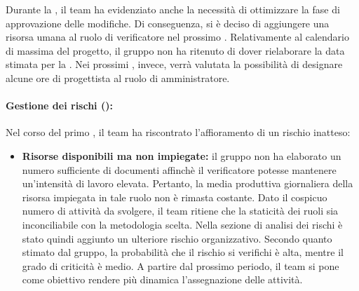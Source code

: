 \vspace{0.5\baselineskip}
\par Durante la , il team ha evidenziato anche la necessità di ottimizzare la fase di approvazione delle modifiche. Di conseguenza, si è deciso di aggiungere una risorsa umana al ruolo di verificatore nel prossimo . Relativamente al calendario di massima del progetto, il gruppo non ha ritenuto di dover rielaborare la data stimata per la . Nei prossimi , invece, verrà valutata la possibilità di designare alcune ore di progettista al ruolo di amministratore.

\paragraph*{Gestione dei rischi ():}
\par Nel corso del primo , il team ha riscontrato l'affioramento di un rischio inatteso:
\begin{itemize}
  \item \textbf{Risorse disponibili ma non impiegate:} il gruppo non ha elaborato un numero sufficiente di documenti affinchè il verificatore potesse mantenere un'intensità di lavoro elevata. Pertanto, la media produttiva giornaliera della risorsa impiegata in tale ruolo non è rimasta costante. Dato il cospicuo numero di attività da svolgere, il team ritiene che la staticità dei ruoli sia inconciliabile con la metodologia scelta. Nella sezione di analisi dei rischi è stato quindi aggiunto un ulteriore rischio organizzativo. Secondo quanto stimato dal gruppo, la probabilità che il rischio si verifichi è alta, mentre il grado di criticità è medio. A partire dal prossimo periodo, il team si pone come obiettivo rendere più dinamica l'assegnazione delle attività.
\end{itemize}

